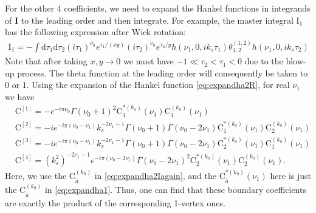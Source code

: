 \documentclass[a4paper,11pt]{article}
\newcommand{\nn}{\nonumber}
\newcommand{\nd}{\mathrm{d}}
\def\ie{\begin{equation}\begin{aligned}}
\def\fe{\end{aligned}\end{equation}}
\begin{document}
For the other 4 coefficients, we need to expand the Hankel functions in integrands of $\textbf{I}$ to the leading order and then integrate. For example, the master integral I$_1$ has the following expression after Wick rotation:
\ie
\text{I}_1=-\int \nd \tau_1 \nd \tau_2  (i\tau_1)^{\nu_{0}}e^{\tau_1/(xy)}(i\tau_2)^{\nu_{0}}e^{\tau_2/y}h(\nu_1,0,ik_s\tau_1) \theta_{1,2}^{(1,2)} h(\nu_1,0,ik_s\tau_2)
\fe
Note that after taking $x,y\to0$ we must have $-1{ \ll}\tau_2<\tau_1<0$ due to the blow-up process. The theta function at the leading order will consequently be taken to 0 or 1. Using the expansion of the Hankel function \eqref{eq:expandha2R}, for real $\nu_1$ we have
\ie
&\text{C}^{[1]}%
=-e^{-i \pi\nu_0}\Gamma (\nu_0+1)^2\text{C}_1^{*(k_0)}(\nu_1)\text{C}_1^{(k_0)}(\nu_1)\\
&\text{C}^{[2]}=%
-ie^{-i \pi  (\nu_0-\nu_1)}  k_s^{-2 \nu_1-1} \Gamma (\nu_0+1)\Gamma (\nu_0-2 \nu_1)\text{C}_1^{*(k_0)}(\nu_1)\text{C}_2^{(k_0)}(\nu_1)\\
&\text{C}^{[3]}%
=-ie^{-i \pi  (\nu_0-\nu_1)}  k_s^{-2 \nu_1-1} \Gamma (\nu_0+1)\Gamma (\nu_0-2 \nu_1)\text{C}_2^{*(k_0)}(\nu_1)\text{C}_1^{(k_0)}(\nu_1)\\
&\text{C}^{[4]}%
=\left(k_s^2\right)^{-2 \nu_1-1} e^{-i \pi  (\nu_0-2 \nu_1)}\Gamma (\nu_0-2 \nu_1)^2\text{C}_2^{*(k_0)}(\nu_1)\text{C}_2^{(k_0)}(\nu_1).
\fe
Here, we use the $\text{C}_{\tilde{a}}^{(k_0)}$  in \eqref{eq:expandha2Iagain}, and the $\text{C}_{\tilde{a}}^{*(k_0)}(\nu_1)$ here is just the $\text{C}_{\tilde{a}}^{(k_0)}$  in \eqref{eq:expandha1}. Thus, one can find that these boundary coefficients are exactly the product of the corresponding 1-vertex ones.
\end{document}
